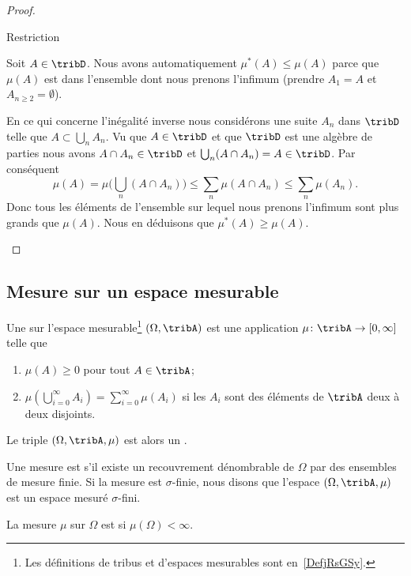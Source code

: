 \begin{proof}
\begin{subproof}
    \item[Restriction]

        Soit \( A\in\tribD\). Nous avons automatiquement \( \mu^*(A)\leq \mu(A)\) parce que \( \mu(A)\) est dans l'ensemble dont nous prenons l'infimum (prendre \( A_1=A\) et \( A_{n\geq 2}=\emptyset\)).

        En ce qui concerne l'inégalité inverse nous considérons une suite \( A_n\) dans \( \tribD\) telle que \( A\subset\bigcup_nA_n\). Vu que \( A\in\tribD\) et que \( \tribD\) est une algèbre de parties nous avons \( A\cap A_n\in \tribD\) et \( \bigcup_n(A\cap A_n)=A\in\tribD\). Par conséquent
        \begin{equation}
            \mu(A)=\mu\big( \bigcup_n(A\cap A_n) \big)\leq \sum_n\mu(A\cap A_n)\leq \sum_n\mu(A_n).
        \end{equation}
        Donc tous les éléments de l'ensemble sur lequel nous prenons l'infimum sont plus grands que \( \mu(A)\). Nous en déduisons que \( \mu^*(A)\geq \mu(A)\).
    \end{subproof}
\end{proof}

\subsection{Mesure sur un espace mesurable}

\begin{definition}  \label{DefBTsgznn}
    Une  sur l'espace mesurable\footnote{Les définitions de tribus et d'espaces mesurables sont en~\ref{DefjRsGSy}.} \( (\Omega,\tribA)\) est une application \( \mu\colon \tribA\to \mathopen[ 0 , \infty \mathclose]\) telle que
    \begin{enumerate}
        \item
            \( \mu(A)\geq 0\) pour tout \( A\in\tribA\);
        \item   \label{ItemQFjtOjXiii}
            \( \mu\left( \bigcup_{i=0}^{\infty}A_i\right)=\sum_{i=0}^{\infty}\mu(A_i)\) si les \( A_i\) sont des éléments de \( \tribA\) deux à deux disjoints.
    \end{enumerate}
            Le triple \( (\Omega,\tribA,\mu)\) est alors un .

    Une mesure est  s'il existe un recouvrement dénombrable de \( \Omega\) par des ensembles de mesure finie. Si la mesure est $\sigma$-finie, nous disons que l'espace \( (\Omega,\tribA,\mu)\) est un espace mesuré $\sigma$-fini.

    La mesure \( \mu\) sur \( \Omega\) est  si \( \mu(\Omega)<\infty\).
\end{definition}

